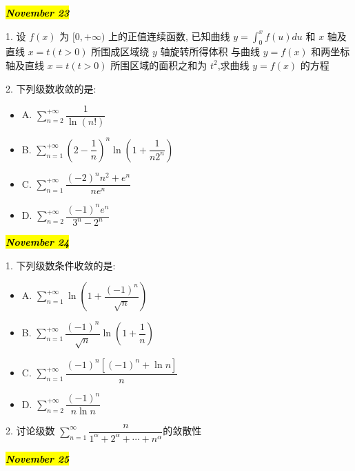 \hl{\textbf{\textit{November 23}}}

1. 设 $f(x)$ 为 $[0,+\infty)$ 上的正值连续函数,
已知曲线 $y=\int_{0}^{x}f(u)du$ 和 $x$ 轴及直线 $x=t(t>0)$ 所围成区域绕 $y$ 轴旋转所得体积
与曲线 $y=f(x)$ 和两坐标轴及直线 $x=t(t>0)$ 所围区域的面积之和为 $t^2$,求曲线 $y=f(x)$ 的方程
\begin{solution}
	
\end{solution}

2. 下列级数收敛的是:
\begin{itemize}
	\item A. $\sum\limits_{n=2}^{+\infty}\dfrac{1}{\ln(n!)}$
	\item B. $\sum\limits_{n=1}^{+\infty}(2-\dfrac{1}{n})^{n}\ln(1+\dfrac{1}{n2^{n}})$
	\item C. $\sum\limits_{n=1}^{+\infty}\dfrac{(-2)^{n}n^2+e^{n}}{ne^{n}}$
	\item D. $\sum\limits_{n=2}^{+\infty}\dfrac{(-1)^{n}e^{n}}{3^{n}-2^{n}}$
\end{itemize}
\begin{solution}
	
\end{solution}

\hl{\textbf{\textit{November 24}}}

1. 下列级数条件收敛的是:
\begin{itemize}
	\item A. $\sum\limits_{n=1}^{+\infty}\ln\left( 1+\dfrac{(-1)^n}{\sqrt{n}}\right) $
	\item B. $\sum\limits_{n=1}^{+\infty}\dfrac{(-1)^n}{\sqrt{n}}\ln(1+\dfrac{1}{n})$
	\item C. $\sum\limits_{n=1}^{+\infty}\dfrac{(-1)^{n}\left[(-1)^{n}+\ln n \right] }{n}$
	\item D. $\sum\limits_{n=2}^{+\infty}\dfrac{(-1)^{n}}{n\ln n}$
\end{itemize}
\begin{solution}
	
\end{solution}

2. 讨论级数 $\sum\limits_{n=1}^{\infty}\dfrac{n}{1^{\alpha}+2^{\alpha}+\cdots+n^{\alpha}}$的敛散性
\begin{solution}
	
\end{solution}

\hl{\textbf{\textit{November 25}}}

